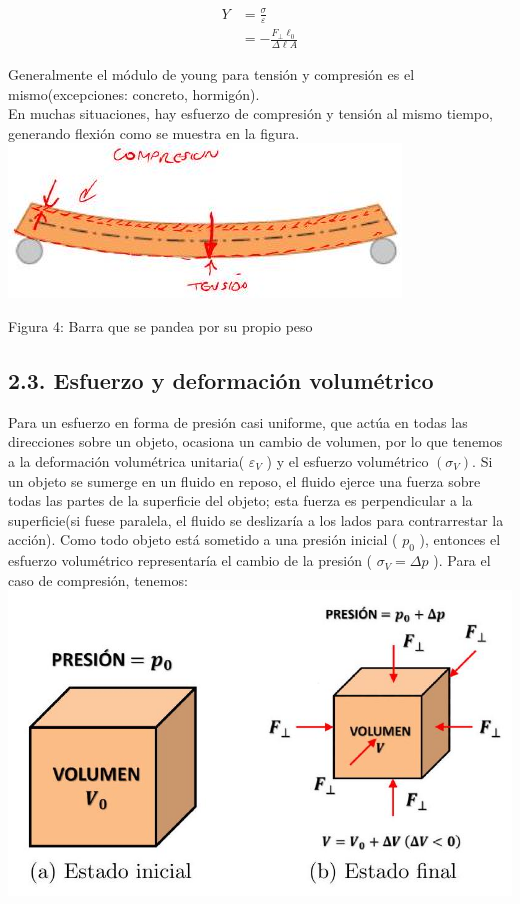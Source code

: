 \documentclass[10pt]{article}
\begin{document}
$$
\begin{aligned}
Y & =\frac{\sigma}{\varepsilon} \\
& =-\frac{F_{\perp} \ell_{0}}{\Delta \ell A}
\end{aligned}
$$

Generalmente el módulo de young para tensión y compresión es el mismo(excepciones: concreto, hormigón).\\
En muchas situaciones, hay esfuerzo de compresión y tensión al mismo tiempo, generando flexión como se muestra en la figura.\\
\includegraphics[max width=\textwidth, center]{2025_04_28_a9941da8947ada55c6c9g-04}

Figura 4: Barra que se pandea por su propio peso

\subsection*{2.3. Esfuerzo y deformación volumétrico}
Para un esfuerzo en forma de presión casi uniforme, que actúa en todas las direcciones sobre un objeto, ocasiona un cambio de volumen, por lo que tenemos a la deformación volumétrica unitaria( $\varepsilon_{V}$ ) y el esfuerzo volumétrico $\left(\sigma_{V}\right)$. Si un objeto se sumerge en un fluido en reposo, el fluido ejerce una fuerza sobre todas las partes de la superficie del objeto; esta fuerza es perpendicular a la superficie(si fuese paralela, el fluido se deslizaría a los lados para contrarrestar la acción). Como todo objeto está sometido a una presión inicial ( $p_{0}$ ), entonces el esfuerzo volumétrico representaría el cambio de la presión ( $\sigma_{V}=\Delta p$ ). Para el caso de compresión, tenemos:\\
\includegraphics[max width=\textwidth, center]{2025_04_28_a9941da8947ada55c6c9g-05}
\end{document}
